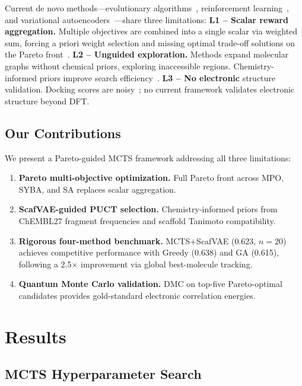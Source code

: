 \documentclass[jcim,article,layout=manuscript]{achemso}
\begin{document}
Current de novo methods---evolutionary algorithms~\cite{Jensen2019},
reinforcement learning~\cite{Olivecrona2017, Zhou2019}, and variational
autoencoders~\cite{GomezBombarelli2018}---share three limitations:
\textbf{L1 -- Scalar reward aggregation.} Multiple objectives are combined
into a single scalar via weighted sum, forcing a priori weight selection and
missing optimal trade-off solutions on the Pareto front~\cite{Mothra2024}.
\textbf{L2 -- Unguided exploration.} Methods expand molecular graphs without
chemical priors, exploring inaccessible regions. Chemistry-informed priors
improve search efficiency~\cite{CombiMOTS2026}. \textbf{L3 -- No electronic}
structure validation. Docking scores are noisy~\cite{Warren2006}; no current
framework validates electronic structure beyond DFT.

\subsection{Our Contributions}

We present a Pareto-guided MCTS framework addressing all three limitations:
\begin{enumerate}[label=\textbf{C\arabic*:}]
  \item \textbf{Pareto multi-objective optimization.} Full Pareto front across
    MPO, SYBA, and SA replaces scalar aggregation.
  \item \textbf{ScafVAE-guided PUCT selection.} Chemistry-informed priors from
    ChEMBL27 fragment frequencies and scaffold Tanimoto compatibility.
  \item \textbf{Rigorous four-method benchmark.} MCTS+ScafVAE (0.623, $n=20$) achieves
    competitive performance with Greedy (0.638) and GA (0.615), following a
    2.5$\times$ improvement via global best-molecule tracking.
  \item \textbf{Quantum Monte Carlo validation.} DMC on top-five Pareto-optimal
    candidates provides gold-standard electronic correlation energies.
\end{enumerate}

\section{Results}

\subsection{MCTS Hyperparameter Search}
\label{sec:hparam}
\end{document}
